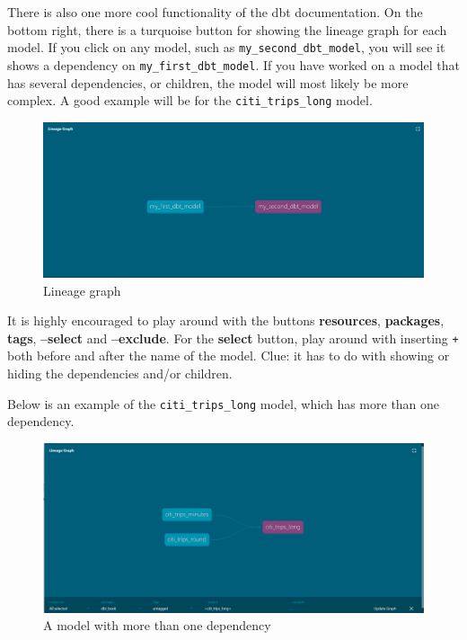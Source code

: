 \documentclass[
]{book}
\begin{document}
There is also one more cool functionality of the dbt documentation. On the bottom right, there is a turquoise button for showing the lineage graph for each model. If you click on any model, such as \texttt{my\_second\_dbt\_model}, you will see it shows a dependency on \texttt{my\_first\_dbt\_model}. If you have worked on a model that has several dependencies, or children, the model will most likely be more complex. A good example will be for the \texttt{citi\_trips\_long} model.

\begin{figure}
\centering
\includegraphics{./images/lineage_graph.png}
\caption{Lineage graph}
\end{figure}

It is highly encouraged to play around with the buttons \textbf{resources}, \textbf{packages}, \textbf{tags}, \textbf{--select} and \textbf{--exclude}. For the \textbf{select} button, play around with inserting \texttt{+} both before and after the name of the model. Clue: it has to do with showing or hiding the dependencies and/or children.

Below is an example of the \texttt{citi\_trips\_long} model, which has more than one dependency.

\begin{figure}
\centering
\includegraphics{./images/lineage_graph2.png}
\caption{A model with more than one dependency}
\end{figure}
\end{document}
